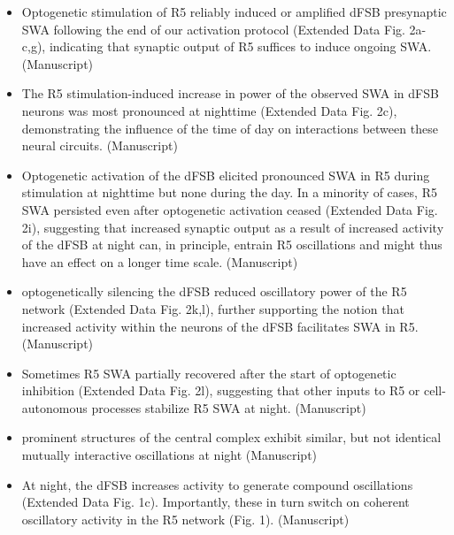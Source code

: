 \documentclass[11pt]{article}
\begin{document}
\begin{itemize}
    \item  Optogenetic stimulation of R5 reliably induced or amplified dFSB presynaptic SWA
    following the end of our activation protocol (Extended Data Fig. 2a-c,g), indicating that
    synaptic output of R5 suffices to induce ongoing SWA.
    \parencite{raccugliaCoherentMultilevelNetwork2022} (Manuscript)

    \item The R5 stimulation-induced increase in
    power of the observed SWA in dFSB neurons was most pronounced at nighttime (Extended
    Data Fig. 2c), demonstrating the influence of the time of day on interactions between these
    neural circuits.
    \parencite{raccugliaCoherentMultilevelNetwork2022} (Manuscript)

    \item Optogenetic activation of the dFSB elicited pronounced SWA in
    R5 during stimulation at nighttime but none during the day.
    In a
    minority of cases, R5 SWA persisted even after optogenetic activation ceased (Extended Data
    Fig. 2i), suggesting that increased synaptic output as a result of increased activity of the dFSB
    at night can, in principle, entrain R5 oscillations and might thus have an effect on a longer time
    scale. 
    \parencite{raccugliaCoherentMultilevelNetwork2022} (Manuscript)

    \item optogenetically silencing the dFSB reduced oscillatory
    power of the R5 network (Extended Data Fig. 2k,l), further supporting the notion that
    increased activity within the neurons of the dFSB facilitates SWA in R5. 
    \parencite{raccugliaCoherentMultilevelNetwork2022} (Manuscript)

    \item Sometimes R5 SWA
    partially recovered after the start of optogenetic inhibition (Extended Data Fig. 2l), suggesting
    that other inputs to R5 or cell-autonomous processes stabilize R5 SWA at night.
    \parencite{raccugliaCoherentMultilevelNetwork2022} (Manuscript)

    \item prominent structures of the
    central complex exhibit similar, but not identical mutually interactive oscillations at night
    \parencite{raccugliaCoherentMultilevelNetwork2022} (Manuscript)

    \item At night, the dFSB increases activity to generate compound
    oscillations (Extended Data Fig. 1c). Importantly, these in turn switch on coherent oscillatory
    activity in the R5 network (Fig. 1).
    \parencite{raccugliaCoherentMultilevelNetwork2022} (Manuscript)


\end{itemize}
\end{document}
